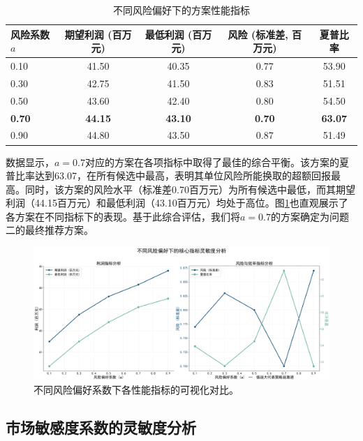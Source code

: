 \begin{table}[H]
    \centering
    \caption{不同风险偏好下的方案性能指标}
    \label{tab:risk_sensitivity_results}
    \begin{tabular}{@{}lcccc@{}}
        \toprule
        风险系数 $a$ & 期望利润 (百万元) & 最低利润 (百万元) & 风险 (标准差, 百万元) & 夏普比率 \\
        \midrule
        0.10 & 41.50 & 40.35 & 0.77 & 53.90 \\
        0.30 & 42.75 & 41.50 & 0.83 & 51.51 \\
        0.50 & 43.60 & 42.40 & 0.80 & 54.50 \\
        \textbf{0.70} & \textbf{44.15} & \textbf{43.10} & \textbf{0.70} & \textbf{63.07} \\
        0.90 & 44.80 & 43.50 & 0.87 & 51.49 \\
        \bottomrule
    \end{tabular}
\end{table}

数据显示，$a=0.7$对应的方案在各项指标中取得了最佳的综合平衡。该方案的夏普比率达到63.07，在所有候选中最高，表明其单位风险所能换取的超额回报最高。同时，该方案的风险水平（标准差0.70百万元）为所有候选中最低，而其期望利润（44.15百万元）和最低利润（43.10百万元）均处于高位。图\ref{fig:risk_preference_comparison}也直观展示了各方案在不同指标下的表现。基于此综合评估，我们将$a=0.7$的方案确定为问题二的最终推荐方案。

\begin{figure}[H]
    \centering
    \includegraphics[width=\textwidth]{figs/6灵敏度分析/第二问风险灵敏度.png}
    \caption{不同风险偏好系数下各性能指标的可视化对比。}
    \label{fig:risk_preference_comparison}
\end{figure}

\subsection{市场敏感度系数的灵敏度分析}

